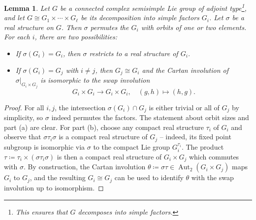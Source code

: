 \documentclass{amsart}
\newcommand{\Aut}{\operatorname{Aut}}
\theoremstyle{definition}
\theoremstyle{plain}
\newtheorem{lem}[defn]{Lemma}
\theoremstyle{remark}
\begin{document}
\begin{lem}
\label{lem:realstr_decomp}
    Let $G$ be a connected complex semisimple Lie group of adjoint type\footnote{This ensures that $G$ decomposes into simple factors.}, and let $G\cong G_1 \times \cdots \times G_\ell$ be its decomposition into simple factors $G_i$. Let $\sigma$ be a real structure on $G$. Then $\sigma$ permutes the $G_i$ with orbits of one or two elements. For each $i$, there are two possibilities:
    \begin{itemize}
        \item[(a)] If $\sigma(G_i) = G_i$, then $\sigma$ restricts to a real structure of $G_i$.
        \item[(b)] If $\sigma(G_i) = G_j$ with $i\ne j$, then $G_j\cong G_i$ and the Cartan involution of $\sigma|_{G_i\times G_j}$ is isomorphic to the \emph{swap involution}
        $$
            G_i\times G_i \to G_i \times G_i,
            \quad
            (g,h) \mapsto (h,g).
        $$
    \end{itemize}
\end{lem}
\begin{proof}
    For all $i,j$, the intersection $\sigma(G_i)\cap G_j$ is either trivial or all of $G_j$ by simplicity, so $\sigma$ indeed permutes the factors. The statement about orbit sizes and part (a) are clear. For part (b), choose any compact real structure $\tau_i$ of $G_i$ and observe that $\sigma\tau_i\sigma$ is a compact real structure of $G_j$ -- indeed, its fixed point subgroup is isomorphic via $\sigma$ to the compact Lie group $G_i^{\tau_i}$. The product $\tau \coloneqq \tau_i\times (\sigma\tau_i\sigma)$ is then a compact real structure of $G_i\times G_j$ which commutes with $\sigma$. By construction, the Cartan involution $\theta\coloneqq \sigma \tau \in \Aut_2(G_i\times G_j)$ maps $G_i$ to $G_j$, and the resulting $G_i\cong G_j$ can be used to identify $\theta$ with the swap involution up to isomorphism.
\end{proof}
\end{document}
